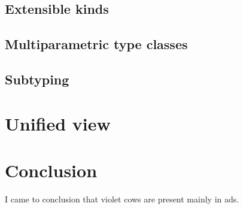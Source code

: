 \documentclass[11pt,oneside,draft]{fithesis2}
\begin{document}
\section{Extensible kinds}

\section{Multiparametric type classes}

\section{Subtyping}

\chapter{Unified view}


\chapter{Conclusion}

I came to conclusion that violet cows are present mainly in ads.



\end{document}
